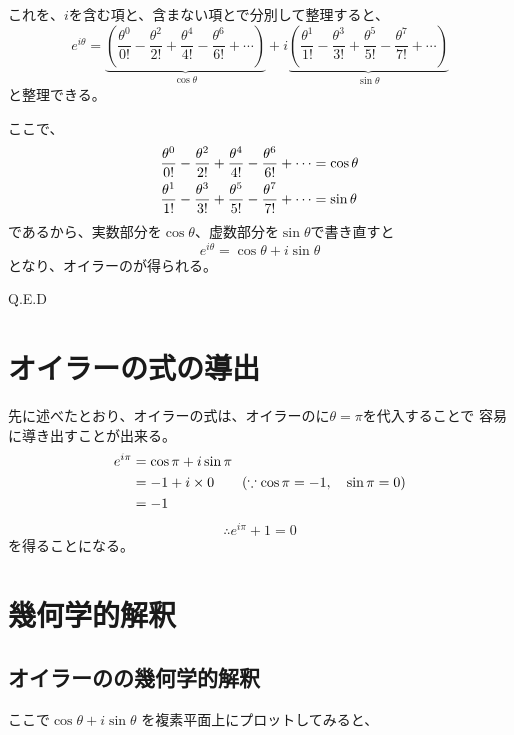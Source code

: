 \documentclass[12pt,a4paper,fleqn]{ltjsarticle}
\begin{document}
これを、$i$を含む項と、含まない項とで分別して整理すると、
\begin{equation*}
    e^{i\theta}= \underbrace{\left( \frac{\theta^0}{0!}-\frac{\theta^2}{2!}
                      + \frac{\theta^4}{4!}-\frac{\theta^6}{6!}+ \dotsb \right)}_{\cos \theta}
               +i\underbrace{\left( \frac{\theta^1}{1!}-\frac{\theta^3}{3!}
                      + \frac{\theta^5}{5!}-\frac{\theta^7}{7!}+ \dotsb \right)}_{\sin \theta}
\end{equation*}
と整理できる。

ここで、
\begin{align}
    \frac{\theta^0}{0!}-\frac{\theta^2}{2!}+\frac{\theta^4}{4!}-\frac{\theta^6}{6!}+ \dotsb &= \cos \theta \notag \\
    \frac{\theta^1}{1!}-\frac{\theta^3}{3!}+\frac{\theta^5}{5!}-\frac{\theta^7}{7!}+ \dotsb &= \sin \theta \notag
\end{align}
であるから、実数部分を$\cos \theta$、虚数部分を$\sin \theta$で書き直すと
\begin{equation*}
    e^{i\theta} = \cos \theta + i \sin \theta \tag{$**$}
\end{equation*}
となり、オイラーのが得られる。
\begin{flushright}
    Q.E.D
\end{flushright}

\section{オイラーの式の導出}
先に述べたとおり、オイラーの式は、オイラーのに$\theta=\pi$を代入することで
容易に導き出すことが出来る。
\begin{align}
    e^{i\pi} &= \cos \pi + i\sin \pi \notag \\
             &= -1 + i \times 0 \qquad (\because \cos \pi = -1, \quad \sin \pi = 0) \notag \\
             &= -1 \notag
\end{align}
{\LARGE
    \begin{equation*}
        \therefore e^{i\pi} + 1 = 0  \tag{$*$}
    \end{equation*}
}
を得ることになる。

\newpage

\section{幾何学的解釈}
\subsection{オイラーのの幾何学的解釈}
ここで$\cos\theta + i\sin\theta$ を複素平面上にプロットしてみると、
\end{document}
